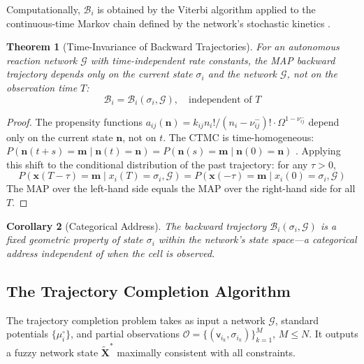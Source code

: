 \documentclass[10pt,twocolumn,a4paper]{article}
\theoremstyle{plain}
\newtheorem{theorem}{Theorem}[section]
\newtheorem{corollary}[theorem]{Corollary}
\theoremstyle{definition}
\theoremstyle{remark}
\newcommand{\fnode}{\mathsf{v}}
\newcommand{\circuit}{\mathcal{G}}
\newcommand{\Back}{\mathcal{B}}
\begin{document}
Computationally, $\Back_i$ is obtained by the Viterbi algorithm \citep{viterbi1967} applied to the continuous-time Markov chain defined by the network's stochastic kinetics \citep{gillespie1977}.

\begin{theorem}[Time-Invariance of Backward Trajectories]
\label{thm:timeinv}
For an autonomous reaction network $\circuit$ with time-independent rate constants, the MAP backward trajectory depends only on the current state $\sigma_i$ and the network $\circuit$, not on the observation time $T$:
\begin{equation}
    \Back_i = \Back_i(\sigma_i, \circuit), \quad \text{independent of } T
\end{equation}
\end{theorem}

\begin{proof}
The propensity functions $a_{ij}(\mathbf{n}) = k_{ij} n_i! / (n_i - \nu_{ij}^-)! \cdot \Omega^{1-\nu_{ij}^-}$ depend only on the current state $\mathbf{n}$, not on $t$. The CTMC is time-homogeneous: $P(\mathbf{n}(t+s) = \mathbf{m} \mid \mathbf{n}(t) = \mathbf{n}) = P(\mathbf{n}(s) = \mathbf{m} \mid \mathbf{n}(0) = \mathbf{n})$ \citep{gillespie1977}. Applying this shift to the conditional distribution of the past trajectory: for any $\tau > 0$,
\begin{equation}
    P(\mathbf{x}(T-\tau) = \mathbf{m} \mid x_i(T) = \sigma_i, \circuit) = P(\mathbf{x}(-\tau) = \mathbf{m} \mid x_i(0) = \sigma_i, \circuit)
\end{equation}
The MAP over the left-hand side equals the MAP over the right-hand side for all $T$.
\end{proof}

\begin{corollary}[Categorical Address]
\label{cor:address}
The backward trajectory $\Back_i(\sigma_i, \circuit)$ is a fixed geometric property of state $\sigma_i$ within the network's state space---a categorical address independent of when the cell is observed.
\end{corollary}

\subsection{The Trajectory Completion Algorithm}

The trajectory completion problem takes as input a network $\circuit$, standard potentials $\{\mu_i^\circ\}$, and partial observations $\mathcal{O} = \{(\fnode_{i_k}, \sigma_{i_k})\}_{k=1}^M$, $M \leq N$. It outputs a fuzzy network state $\widetilde{\mathbf{X}}^*$ maximally consistent with all constraints.
\end{document}
